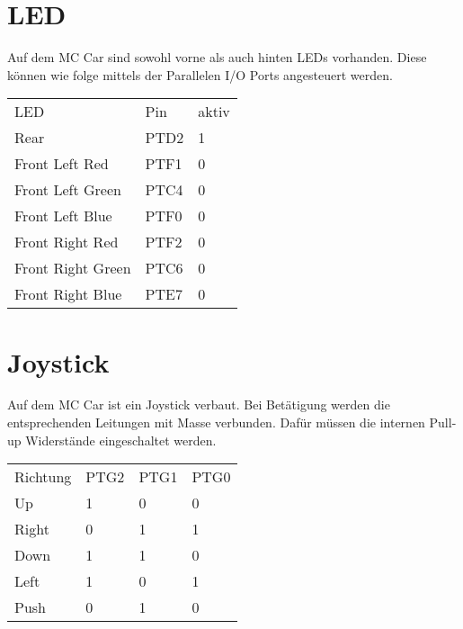 \documentclass[a4paper,10pt,fleqn]{article}
\begin{document}
\section{LED}
Auf dem MC Car sind sowohl vorne als auch hinten LEDs vorhanden. Diese können 
wie folge mittels der Parallelen I/O Ports angesteuert werden. \\
\begin{table}[h!]
\begin{tabular}{lll}
\rowcolor{white} LED                 & Pin   & aktiv \\
\rowcolor{lgray} Rear                & PTD2  & 1     \\
\rowcolor{white} Front Left  Red     & PTF1  & 0     \\
\rowcolor{lgray} Front Left  Green   & PTC4  & 0     \\
\rowcolor{white} Front Left  Blue    & PTF0  & 0     \\
\rowcolor{lgray} Front Right Red     & PTF2  & 0     \\
\rowcolor{white} Front Right Green   & PTC6  & 0     \\
\rowcolor{lgray} Front Right Blue    & PTE7  & 0     \\
\end{tabular}
\end{table}

\section{Joystick}
Auf dem MC Car ist ein Joystick verbaut. Bei Betätigung werden die 
entsprechenden Leitungen mit Masse verbunden. Dafür müssen die internen 
Pull-up Widerstände eingeschaltet werden. 
\begin{table}[h!]
\begin{tabular}{llll}
\rowcolor{white} Richtung    & PTG2  & PTG1  & PTG0  \\
\rowcolor{lgray} Up          & 1     & 0     & 0     \\
\rowcolor{white} Right       & 0     & 1     & 1     \\
\rowcolor{lgray} Down        & 1     & 1     & 0     \\
\rowcolor{white} Left        & 1     & 0     & 1     \\
\rowcolor{lgray} Push        & 0     & 1     & 0     \\
\end{tabular}
\end{table}
\end{document}
